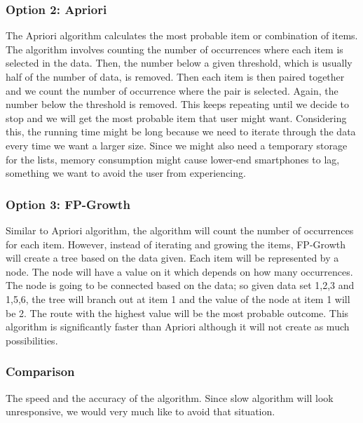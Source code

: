 \documentclass[journal,compsoc, 10pt, draftclsnofoot, onecolumn]{IEEEtran}
\begin{document}
\subsubsection*{Option 2: Apriori}
The Apriori algorithm calculates the most probable item or combination of items. The
algorithm involves counting the number of occurrences where each item is selected in
the data. Then, the number below a given threshold, which is usually half of the
number of data, is removed. Then each item is then paired together and we count the
number of occurrence where the pair is selected. Again, the number below the
threshold is removed. This keeps repeating until we decide to stop and we will get
the most probable item that user might want. Considering this, the running time might
be long because we need to iterate through the data every time we want a larger size.
Since we might also need a temporary storage for the lists, memory consumption might
cause lower-end smartphones to lag, something we want to avoid the user from
experiencing.

\subsubsection*{Option 3: FP-Growth}
Similar to Apriori algorithm, the algorithm will count the number of occurrences for
each item. However, instead of iterating and growing the items, FP-Growth will create
a tree based on the data given. Each item will be represented by a node. The node
will have a value on it which depends on how many occurrences. The node is going to
be connected based on the data; so given data set {1,2,3} and {1,5,6}, the tree will
branch out at item 1 and the value of the node at item 1 will be 2. The route with
the highest value will be the most probable outcome. This algorithm is significantly
faster than Apriori although it will not create as much possibilities.

\subsubsection*{Comparison}
The speed and the accuracy of the algorithm. Since slow algorithm will look
unresponsive, we would very much like to avoid that situation.
\end{document}
